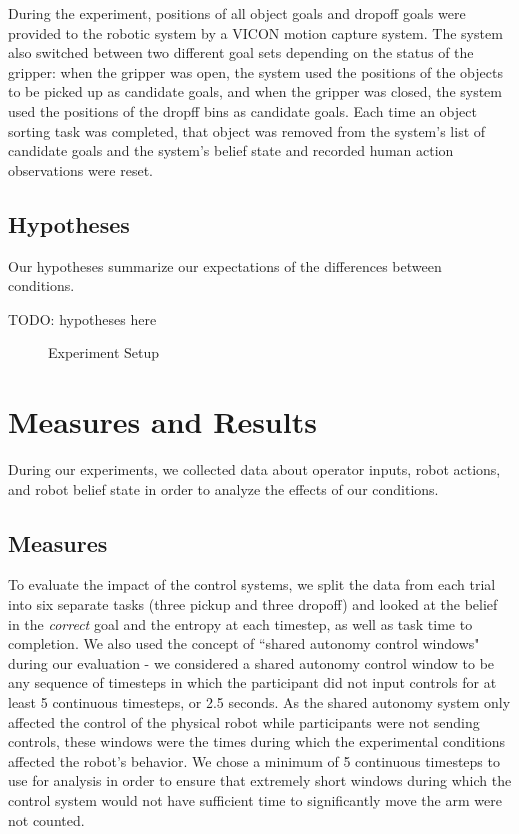\documentclass[conference]{IEEEtran}
\begin{document}

During the experiment, positions of all object goals and dropoff goals were provided to the robotic system by a VICON motion capture system. The system also switched between two different goal sets depending on the status of the gripper: when the gripper was open, the system used the positions of the objects to be picked up as candidate goals, and when the gripper was closed, the system used the positions of the dropff bins as candidate goals. Each time an object sorting task was completed, that object was removed from the system's list of candidate goals and the system's belief state and recorded human action observations were reset.

\subsection{Hypotheses}

Our hypotheses summarize our expectations of the differences between conditions.

TODO: hypotheses here

\begin{figure}
\caption{Experiment Setup}
\label{exp_setup}
\end{figure}

\section{Measures and Results}

During our experiments, we collected data about operator inputs, robot actions, and robot belief state in order to analyze the effects of our conditions.

\subsection{Measures}

To evaluate the impact of the control systems, we split the data from each trial into six separate tasks (three pickup and three dropoff) and looked at the belief in the \textit{correct} goal and the entropy at each timestep, as well as task time to completion. We also used the concept of ``shared autonomy control windows" during our evaluation - we considered a shared autonomy control window to be any sequence of timesteps in which the participant did not input controls for at least 5 continuous timesteps, or 2.5 seconds. As the shared autonomy system only affected the control of the physical robot while participants were not sending controls, these windows were the times during which the experimental conditions affected the robot's behavior. We chose a minimum of 5 continuous timesteps to use for analysis in order to ensure that extremely short windows during which the control system would not have sufficient time to significantly move the arm were not counted. 
\end{document}
